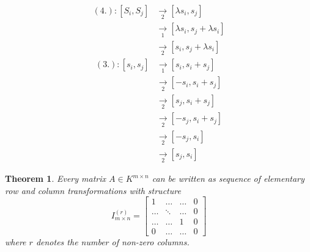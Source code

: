 \documentclass[a4paper,landscape,twocolumn]{article}
\newtheorem{theorem}{Theorem}[section]
\begin{document}
\begin{align*}
  (4.):
    [S_i, S_j] &\underset{2}{\rightarrow} [\lambda s_i, s_j] \\
      &\underset{1}{\rightarrow} [\lambda s_i, s_j + \lambda s_i] \\
      &\underset{2}{\rightarrow} [s_i, s_j + \lambda s_i]
\end{align*}
\begin{align*}
  (3.): [s_i, s_j] &\underset{1}{\rightarrow} [s_i, s_i + s_j] \\
    &\underset{2}{\rightarrow} [-s_i, s_i + s_j] \\
    &\underset{2}{\rightarrow} [s_j, s_i + s_j] \\
    &\underset{2}{\rightarrow} [-s_j, s_i + s_j] \\
    &\underset{2}{\rightarrow} [-s_j, s_i] \\
    &\underset{2}{\rightarrow} [s_j, s_i]
\end{align*}
%
\begin{theorem}
  \label{satz-6.24}
  Every matrix $A \in K^{m\times n}$ can be written as sequence of elementary
  row and column transformations with structure
  \[
    I_{m \times n}^{(r)} =
    \begin{bmatrix}
      1 & \ldots & \ldots & 0 \\
      \ldots & \ddots & \ldots & 0 \\
      \ldots & \ldots & 1 & 0 \\
      0 & \ldots & \ldots & 0
    \end{bmatrix}
  \]
  where $r$ denotes the number of non-zero columns.
\end{theorem}
%
\end{document}
